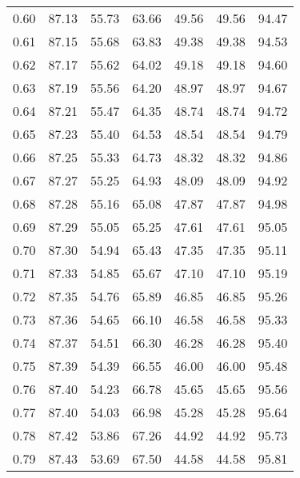 \begin{tabular}{|c|c|c|c|c|c|c|}
      0.60 &     87.13 &     55.73 &      63.66 &   49.56 &      49.56 &         94.47 \\
      0.61 &     87.15 &     55.68 &      63.83 &   49.38 &      49.38 &         94.53 \\
      0.62 &     87.17 &     55.62 &      64.02 &   49.18 &      49.18 &         94.60 \\
      0.63 &     87.19 &     55.56 &      64.20 &   48.97 &      48.97 &         94.67 \\
      0.64 &     87.21 &     55.47 &      64.35 &   48.74 &      48.74 &         94.72 \\
      0.65 &     87.23 &     55.40 &      64.53 &   48.54 &      48.54 &         94.79 \\
      0.66 &     87.25 &     55.33 &      64.73 &   48.32 &      48.32 &         94.86 \\
      0.67 &     87.27 &     55.25 &      64.93 &   48.09 &      48.09 &         94.92 \\
      0.68 &     87.28 &     55.16 &      65.08 &   47.87 &      47.87 &         94.98 \\
      0.69 &     87.29 &     55.05 &      65.25 &   47.61 &      47.61 &         95.05 \\
      0.70 &     87.30 &     54.94 &      65.43 &   47.35 &      47.35 &         95.11 \\
      0.71 &     87.33 &     54.85 &      65.67 &   47.10 &      47.10 &         95.19 \\
      0.72 &     87.35 &     54.76 &      65.89 &   46.85 &      46.85 &         95.26 \\
      0.73 &     87.36 &     54.65 &      66.10 &   46.58 &      46.58 &         95.33 \\
      0.74 &     87.37 &     54.51 &      66.30 &   46.28 &      46.28 &         95.40 \\
      0.75 &     87.39 &     54.39 &      66.55 &   46.00 &      46.00 &         95.48 \\
      0.76 &     87.40 &     54.23 &      66.78 &   45.65 &      45.65 &         95.56 \\
      0.77 &     87.40 &     54.03 &      66.98 &   45.28 &      45.28 &         95.64 \\
      0.78 &     87.42 &     53.86 &      67.26 &   44.92 &      44.92 &         95.73 \\
      0.79 &     87.43 &     53.69 &      67.50 &   44.58 &      44.58 &         95.81 \\

\end{tabular}
